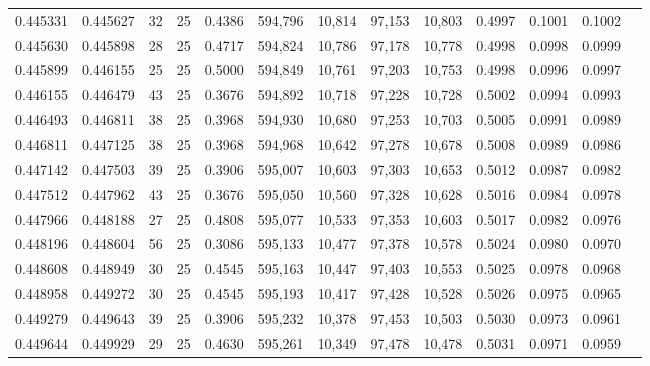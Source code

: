 \begin{tabular}{rrrrrrrrrrrrr}
0.445331 & 0.445627 &    32 &  25 &                                     0.4386 & 594,796 &  10,814 &  97,153 &  10,803 & 0.4997 & 0.1001 & 0.1002 \\
0.445630 & 0.445898 &    28 &  25 &                                     0.4717 & 594,824 &  10,786 &  97,178 &  10,778 & 0.4998 & 0.0998 & 0.0999 \\
0.445899 & 0.446155 &    25 &  25 &                                     0.5000 & 594,849 &  10,761 &  97,203 &  10,753 & 0.4998 & 0.0996 & 0.0997 \\
0.446155 & 0.446479 &    43 &  25 &                                     0.3676 & 594,892 &  10,718 &  97,228 &  10,728 & 0.5002 & 0.0994 & 0.0993 \\
0.446493 & 0.446811 &    38 &  25 &                                     0.3968 & 594,930 &  10,680 &  97,253 &  10,703 & 0.5005 & 0.0991 & 0.0989 \\
0.446811 & 0.447125 &    38 &  25 &                                     0.3968 & 594,968 &  10,642 &  97,278 &  10,678 & 0.5008 & 0.0989 & 0.0986 \\
0.447142 & 0.447503 &    39 &  25 &                                     0.3906 & 595,007 &  10,603 &  97,303 &  10,653 & 0.5012 & 0.0987 & 0.0982 \\
0.447512 & 0.447962 &    43 &  25 &                                     0.3676 & 595,050 &  10,560 &  97,328 &  10,628 & 0.5016 & 0.0984 & 0.0978 \\
0.447966 & 0.448188 &    27 &  25 &                                     0.4808 & 595,077 &  10,533 &  97,353 &  10,603 & 0.5017 & 0.0982 & 0.0976 \\
0.448196 & 0.448604 &    56 &  25 &                                     0.3086 & 595,133 &  10,477 &  97,378 &  10,578 & 0.5024 & 0.0980 & 0.0970 \\
0.448608 & 0.448949 &    30 &  25 &                                     0.4545 & 595,163 &  10,447 &  97,403 &  10,553 & 0.5025 & 0.0978 & 0.0968 \\
0.448958 & 0.449272 &    30 &  25 &                                     0.4545 & 595,193 &  10,417 &  97,428 &  10,528 & 0.5026 & 0.0975 & 0.0965 \\
0.449279 & 0.449643 &    39 &  25 &                                     0.3906 & 595,232 &  10,378 &  97,453 &  10,503 & 0.5030 & 0.0973 & 0.0961 \\
0.449644 & 0.449929 &    29 &  25 &                                     0.4630 & 595,261 &  10,349 &  97,478 &  10,478 & 0.5031 & 0.0971 & 0.0959 \\

\end{tabular}
